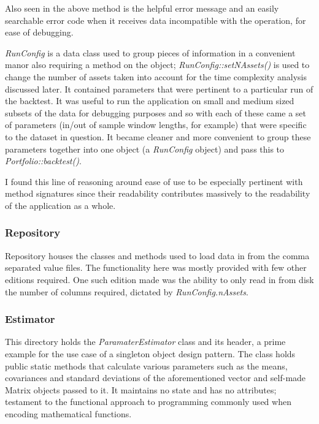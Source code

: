 \documentclass{article}
\begin{document}
Also seen in the above method is the helpful error message and an easily searchable error code when it receives data incompatible with the operation, for ease of debugging.

\textit{RunConfig} is a data class used to group pieces of information in a convenient manor also requiring a method on the object; \textit{RunConfig::setNAssets()} is used to change the number of assets taken into account for the time complexity analysis discussed later. It contained parameters that were pertinent to a particular run of the backtest. It was useful to run the application on small and medium sized subsets of the data for debugging purposes and so with each of these came a set of parameters (in/out of sample window lengths, for example) that were specific to the dataset in question. It became cleaner and more convenient to group these parameters together into one object (a \textit{RunConfig} object) and pass this to \textit{Portfolio::backtest()}.  

I found this line of reasoning around ease of use to be especially pertinent with method signatures since their readability contributes massively to the readability of the application as a whole.  


\subsubsection{Repository}
\label{sec:repository}

Repository houses the classes and methods used to load data in from the comma separated value files. The functionality here was mostly provided with few other editions required. One such edition made was the ability to only read in from disk the number of columns required, dictated by \textit{RunConfig.nAssets}.


\subsubsection{Estimator}
\label{sec:parameter_estimation}

This directory holds the \textit{ParamaterEstimator} class and its header, a prime example for the use case of a singleton object design pattern. The class holds public static methods that calculate various parameters such as the means, covariances and standard deviations of the aforementioned vector and self-made Matrix objects passed to it. It maintains no state and has no attributes; testament to the functional approach to programming commonly used when encoding mathematical functions.
\end{document}
